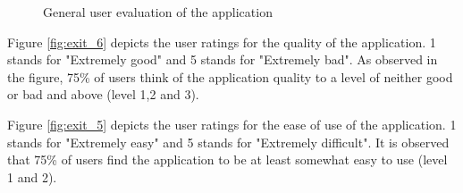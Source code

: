 \begin{figure}[htp]
\hspace{1em}
\newline
\centering
{}
\caption{General user evaluation of the application}
\label{fig:st3}
\end{figure}

Figure \ref{fig:exit_6} depicts the user ratings for the quality of the application. 1 stands for "Extremely good" and 5 stands for "Extremely bad". As observed in the figure, 75\% of users think of the application quality to a level of neither good or bad and above (level 1,2 and 3).

Figure \ref{fig:exit_5} depicts the user ratings for the ease of use of the application. 1 stands for "Extremely easy" and 5 stands for "Extremely difficult". It is observed that 75\% of users find the application to be at least somewhat easy to use (level 1 and 2).

